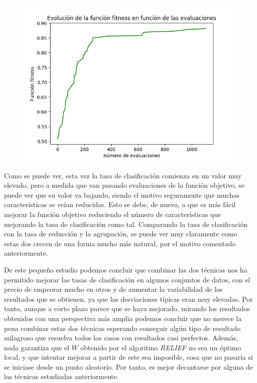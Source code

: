\documentclass[11pt,a4paper]{article}
\begin{document}
\begin{figure}[H]
\centering
\includegraphics[scale=0.6]{img/fit_localr.png}
\end{figure}

Como se puede ver, esta vez la tasa de clasificación comienza en un valor muy elevado, pero a medida que van pasando
evaluaciones de la función objetivo, se puede ver que su valor va bajando, siendo el motivo seguramente que muchas
características se veían reducidas. Esto se debe, de nuevo, a que es más fácil mejorar la función objetivo reduciendo el
número de características que mejorando la tasa de clasificación como tal. Comparando la tasa de clasificación con la tasa
de reducción y la agrupación, se puede ver muy claramente como estas dos crecen de una forma mucho más natural, por el motivo
comentado anteriormente.

De este pequeño estudio podemos concluir que combinar las dos técnicas nos ha permitido mejorar las tasas de clasificación
en algunos conjuntos de datos, con el precio de empeorar mucho en otros y de aumentar la variabilidad de los resultados
que se obtienen, ya que las desviaciones típicas eran muy elevadas. Por tanto, aunque a corto plazo parece que se haya
mejorado, mirando los resultados obtenidos con una perspectiva más amplia podemos concluir que no merece la pena combinar
estas dos técnicas esperando conseguir algún tipo de resultado milagroso que resuelva todos los casos con resultados casi
perfectos. Además, nada garantiza que el $W$ obtenido por el algoritmo \textit{RELIEF} no sea un óptimo local, y que
intentar mejorar a partir de este sea imposible, cosa que no pasaría si se iniciase desde un punto aleatorio. Por tanto, es
mejor decantarse por alguna de las técnicas estudiadas anteriormente.
\end{document}
